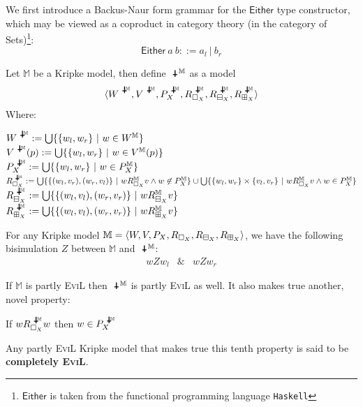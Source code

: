 We first introduce a Backus-Naur form grammar for the $\mathsf{Either}$ type constructor, which may be viewed as a coproduct in category theory (in the category of Sets)\footnote{$\mathsf{Either}$ is taken from the functional programming language \texttt{Haskell}}\label{eitherdef}:
\[ \mathsf{Either}\ a\ b ::= a_l \ |\ b_r \]
\begin{mydef}
Let $\mathbb{M}$ be a Kripke model, then define $\invis^\mathbb{M}$ as a model
\[\la W^{\invis^\mathbb{M}},V^{\invis^\mathbb{M}}, P^{\invis^\mathbb{M}}_X,R^{\invis^\mathbb{M}}_{\Nec_X},R^{\invis^\mathbb{M}}_{\BB_X},R^{\invis^\mathbb{M}}_{\BBI_X}\ra\] 
Where:
\begin{tabbing}
$W^{\invis^\mathbb{M}} := \bigcup\{\{w_l,w_r\}\ |\ w\in W^\mathbb{M}\}$\\
$V^{\invis^\mathbb{M}}(p) := \bigcup\{\{w_l,w_r\}\ |\ w\in V^\mathbb{M}(p)\}$\\
$P^{\invis^\mathbb{M}}_X := \bigcup\{\{w_l,w_r\}\ |\  w\in P^\mathbb{M}_X\}$\\
$R^{\invis^\mathbb{M}}_{\Nec_X} := \bigcup\{\{(w_l,v_r),(w_r,v_l)\}\ |\ w R^\mathbb{M}_{\Nec_X} v \wedge w \nin P^\mathbb{M}_X\} \cup \bigcup\{\{w_l,w_r\}\times \{v_l,v_r\}\ |\ w R^\mathbb{M}_{\Nec_X} v \wedge w \in P^\mathbb{M}_X\}$\\
$R^{\invis^\mathbb{M}}_{\BB_X} := \bigcup\{\{(w_l,v_l),(w_r,v_r)\}\ | \ w R^\mathbb{M}_{\BB_X} v \}$ \\
$R^{\invis^\mathbb{M}}_{\BBI_X} := \bigcup\{\{(w_l,v_l),(w_r,v_r)\}\ | \ w R^\mathbb{M}_{\BBI_X} v \}$
\end{tabbing}

\end{mydef}
\begin{lemma}\label{bisimulation}
For any Kripke model $\mathbb{M} = \langle W,V,P_X,R_{\Box_X},R_{\boxminus_X}, R_{\boxplus_X}\rangle$, we have the following bisimulation $Z$ between $\mathbb{M}$ and $\invis^\mathbb{M}$:
\begin{eqnarray*} w Z w_l & \& & w Z w_r \end{eqnarray*}
\end{lemma}

\begin{lemma}
If $\mathbb{M}$ is partly \textsc{EviL} then $\invis^\mathbb{M}$ is partly \textsc{EviL} as well.  It also makes true another, novel property: 
\begin{mynum}[start=10,resume]
\item If $w R^{\invis^\mathbb{M}}_{\Nec_X} w$ then $w\in P^{\invis^\mathbb{M}}_X$
\end{mynum}
Any partly \textsc{EviL} Kripke model that makes true this tenth property is said to be \textbf{completely \textsc{EviL}}.
\end{lemma}

